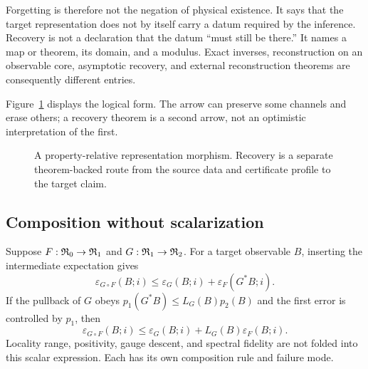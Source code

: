 Forgetting is therefore not the negation of physical existence.  It says that
the target representation does not by itself carry a datum required by the
inference.  Recovery is not a declaration that the datum ``must still be
there.''  It names a map or theorem, its domain, and a modulus.  Exact
inverses, reconstruction on an observable core, asymptotic recovery, and
external reconstruction theorems are consequently different entries.

Figure~\ref{fig:profile} displays the logical form.  The arrow can preserve
some channels and erase others; a recovery theorem is a second arrow, not an
optimistic interpretation of the first.

\begin{figure}[t]
\centering
{}
\caption{A property-relative representation morphism.  Recovery is a
separate theorem-backed route from the source data and certificate profile to
the target claim.}
\label{fig:profile}
\end{figure}

\subsection{Composition without scalarization}

Suppose $F:\mathfrak R_0\to\mathfrak R_1$ and $G:\mathfrak R_1\to\mathfrak R_2$.  For a target
observable $B$, inserting the intermediate expectation gives
\begin{equation}
\label{eq:composition}
 \varepsilon_{G\circ F}(B;i)
 \leq \varepsilon_G(B;i)+\varepsilon_F(G^*B;i).
\end{equation}
If the pullback of $G$ obeys
$p_1(G^*B)\leq L_G(B)p_2(B)$ and the first error is controlled by $p_1$,
then
\[
 \varepsilon_{G\circ F}(B;i)
 \leq \varepsilon_G(B;i)+L_G(B)\varepsilon_F(B;i).
\]
Locality range, positivity, gauge descent, and spectral fidelity are not
folded into this scalar expression.  Each has its own composition rule and
failure mode.

